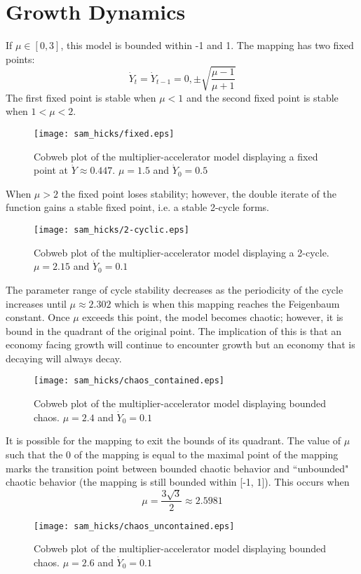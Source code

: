 \section{Growth Dynamics}
If $\mu\in[0,3]$, this model is bounded within -1 and 1. The mapping has two fixed points:
\begin{equation}
    \dot Y_t=\dot Y_{t-1}=0,\pm\sqrt{\frac{\mu-1}{\mu+1}}
\end{equation}
The first fixed point is stable when $\mu<1$ and the second fixed point is stable when $1<\mu<2$.
\begin{figure}
    \centering
    \texttt{[image: sam\_hicks/fixed.eps]}
    \caption{Cobweb plot of the multiplier-accelerator model displaying a fixed point at $\dot Y\approx0.447$. $\mu=1.5$ and $\dot Y_0=0.5$}
    \label{mult_fixed}
\end{figure}

When $\mu>2$ the fixed point loses stability; however, the double iterate of the function gains a stable fixed point, i.e. a stable 2-cycle forms. 

\begin{figure}
    \centering
    \texttt{[image: sam\_hicks/2-cyclic.eps]}
    \caption{Cobweb plot of the multiplier-accelerator model displaying a 2-cycle. $\mu=2.15$ and $\dot Y_0=0.1$}
    \label{mult_2-cycle}
\end{figure}
The parameter range of cycle stability decreases as the periodicity of the cycle increases until $\mu\approx2.302$ which is when this mapping reaches the Feigenbaum constant. Once $\mu$ exceeds this point, the model becomes chaotic; however, it is bound in the quadrant of the original point. The implication of this is that an economy facing growth will continue to encounter growth but an economy that is decaying will always decay.
\begin{figure}
    \centering
    \texttt{[image: sam\_hicks/chaos\_contained.eps]}
    \caption{Cobweb plot of the multiplier-accelerator model displaying bounded chaos. $\mu=2.4$ and $\dot Y_0=0.1$}
    \label{mult_bounded-chaos}
\end{figure}
It is possible for the mapping to exit the bounds of its quadrant. The value of $\mu$ such that the 0 of the mapping is equal to the maximal point of the mapping marks the transition point between bounded chaotic behavior and ``unbounded" chaotic behavior (the mapping is still bounded within [-1, 1]). This occurs when 
\begin{equation*}
    \mu=\frac{3\sqrt{3}}{2}\approx2.5981
\end{equation*}
\begin{figure}
    \centering
    \texttt{[image: sam\_hicks/chaos\_uncontained.eps]}
    \caption{Cobweb plot of the multiplier-accelerator model displaying bounded chaos. $\mu=2.6$ and $\dot Y_0=0.1$}
    \label{mult_unbounded-chaos}
\end{figure}

